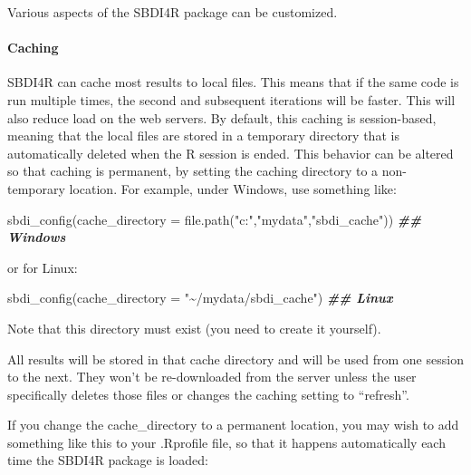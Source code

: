 \documentclass[
  10pt,
]{article}
\newenvironment{Shaded}{\begin{snugshade}}{\end{snugshade}}
\newcommand{\AttributeTok}[1]{\textcolor[rgb]{0.77,0.63,0.00}{#1}}
\newcommand{\DocumentationTok}[1]{\textcolor[rgb]{0.56,0.35,0.01}{\textbf{\textit{#1}}}}
\newcommand{\FunctionTok}[1]{\textcolor[rgb]{0.00,0.00,0.00}{#1}}
\newcommand{\NormalTok}[1]{#1}
\newcommand{\StringTok}[1]{\textcolor[rgb]{0.31,0.60,0.02}{#1}}
\begin{document}
Various aspects of the SBDI4R package can be customized.

\hypertarget{caching}{%
\paragraph*{Caching}\label{caching}}

SBDI4R can cache most results to local files. This means that if the same code is run multiple times, the second and subsequent iterations will be faster. This will also reduce load on the web servers. By default, this caching is session-based, meaning that the local files are stored in a temporary directory that is automatically deleted when the R session is ended. This behavior can be altered so that caching is permanent, by setting the caching directory to a non-temporary location. For example, under Windows, use something like:

\begin{Shaded}
\begin{Highlighting}[]
\FunctionTok{sbdi\_config}\NormalTok{(}\AttributeTok{cache\_directory =} \FunctionTok{file.path}\NormalTok{(}\StringTok{"c:"}\NormalTok{,}\StringTok{"mydata"}\NormalTok{,}\StringTok{"sbdi\_cache"}\NormalTok{)) }\DocumentationTok{\#\# Windows}
\end{Highlighting}
\end{Shaded}

or for Linux:

\begin{Shaded}
\begin{Highlighting}[]
\FunctionTok{sbdi\_config}\NormalTok{(}\AttributeTok{cache\_directory =} \StringTok{"\textasciitilde{}/mydata/sbdi\_cache"}\NormalTok{) }\DocumentationTok{\#\# Linux}
\end{Highlighting}
\end{Shaded}

Note that this directory must exist (you need to create it yourself).

All results will be stored in that cache directory and will be used from one session to the next. They won't be re-downloaded from the server unless the user specifically deletes those files or changes the caching setting to ``refresh''.

If you change the cache\_directory to a permanent location, you may wish to add something like this to your .Rprofile file, so that it happens automatically each time the SBDI4R package is loaded:
\end{document}

